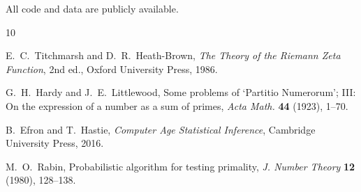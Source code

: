 \documentclass[12pt,a4paper]{article}
\theoremstyle{plain}
\begin{document}
All code and data are publicly available.

\begin{thebibliography}{10}

 E.~C.~Titchmarsh and D.~R.~Heath-Brown,
  {\it The Theory of the Riemann Zeta Function},
  2nd ed., Oxford University Press, 1986.

 G.~H.~Hardy and J.~E.~Littlewood,
  Some problems of `Partitio Numerorum'; III: On the expression
  of a number as a sum of primes,
  {\it Acta Math.} \textbf{44} (1923), 1--70.

 B.~Efron and T.~Hastie,
  {\it Computer Age Statistical Inference}, Cambridge University Press, 2016.

 M.~O.~Rabin,
  Probabilistic algorithm for testing primality,
  {\it J. Number Theory} \textbf{12} (1980), 128--138.

\end{thebibliography}
\end{document}
